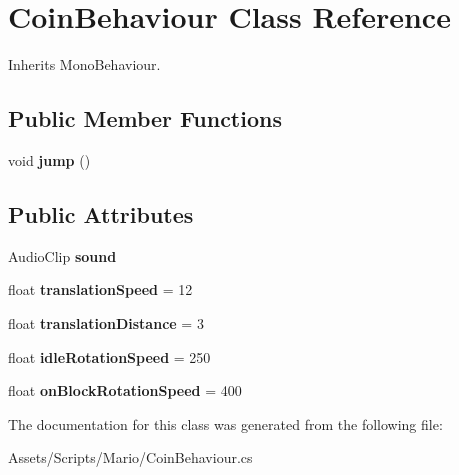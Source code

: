 \hypertarget{class_coin_behaviour}{\section{Coin\-Behaviour Class Reference}
\label{class_coin_behaviour}
}


Inherits Mono\-Behaviour.

\subsection*{Public Member Functions}
\begin{DoxyCompactItemize}
\item 
\hypertarget{class_coin_behaviour_a8c454d49460078be62f96b5d09510f81}{void {\bfseries jump} ()}\label{class_coin_behaviour_a8c454d49460078be62f96b5d09510f81}

\end{DoxyCompactItemize}
\subsection*{Public Attributes}
\begin{DoxyCompactItemize}
\item 
\hypertarget{class_coin_behaviour_a0ed6ba0938e773444c87b77504395e3f}{Audio\-Clip {\bfseries sound}}\label{class_coin_behaviour_a0ed6ba0938e773444c87b77504395e3f}

\item 
\hypertarget{class_coin_behaviour_aab57c177e97f45958833e342acd2edc5}{float {\bfseries translation\-Speed} = 12}\label{class_coin_behaviour_aab57c177e97f45958833e342acd2edc5}

\item 
\hypertarget{class_coin_behaviour_ae739b76c066b40893f797b6d095362ef}{float {\bfseries translation\-Distance} = 3}\label{class_coin_behaviour_ae739b76c066b40893f797b6d095362ef}

\item 
\hypertarget{class_coin_behaviour_a5cd804c2b4769d147e476cbb41dc0eb1}{float {\bfseries idle\-Rotation\-Speed} = 250}\label{class_coin_behaviour_a5cd804c2b4769d147e476cbb41dc0eb1}

\item 
\hypertarget{class_coin_behaviour_a6ec97a75ae69e7a1c323cab9a80593c2}{float {\bfseries on\-Block\-Rotation\-Speed} = 400}\label{class_coin_behaviour_a6ec97a75ae69e7a1c323cab9a80593c2}

\end{DoxyCompactItemize}


The documentation for this class was generated from the following file\-:\begin{DoxyCompactItemize}
\item 
Assets/\-Scripts/\-Mario/Coin\-Behaviour.\-cs\end{DoxyCompactItemize}
